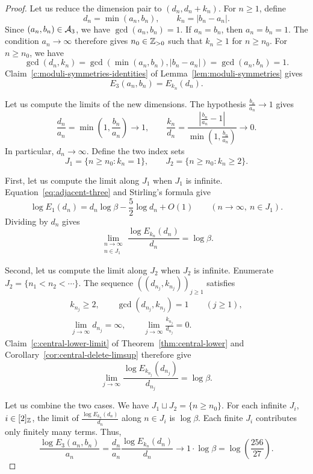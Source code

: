 \begin{proof}
Let us reduce the dimension pair to $(d_n,d_n+k_n)$.
For $n\ge1$, define
\[
 d_n=\min(a_n,b_n),\qquad k_n=|b_n-a_n|.
\]
Since $(a_n,b_n)\in\mathcal A_3$, we have $\gcd(a_n,b_n)=1$.
If $a_n=b_n$, then $a_n=b_n=1$.
The condition $a_n\to\infty$ therefore gives $n_0\in\mathbb Z_{>0}$ such that $k_n\ge1$ for $n\ge n_0$.
For $n\ge n_0$, we have
\[
 \gcd(d_n,k_n)=\gcd(\min(a_n,b_n),|b_n-a_n|)=\gcd(a_n,b_n)=1.
\]
Claim~\ref{c:moduli-symmetries-identities} of Lemma~\ref{lem:moduli-symmetries} gives
\[
 E_3(a_n,b_n)=E_{k_n}(d_n).
\]

Let us compute the limits of the new dimensions.
The hypothesis $\frac{b_n}{a_n}\to1$ gives
\[
 \frac{d_n}{a_n}=\min\left(1,\frac{b_n}{a_n}\right)\longrightarrow1,
 \qquad
 \frac{k_n}{d_n}
 =\frac{\left|\frac{b_n}{a_n}-1\right|}{\min\left(1,\frac{b_n}{a_n}\right)}
 \longrightarrow0.
\]
In particular, $d_n\to\infty$.
Define the two index sets
\[
 J_1=\{n\ge n_0:k_n=1\},\qquad
 J_2=\{n\ge n_0:k_n\ge2\}.
\]

First, let us compute the limit along $J_1$ when $J_1$ is infinite.
Equation~\eqref{eq:adjacent-three} and Stirling's formula give
\[
 \log E_1(d_n)=d_n\log\beta-\frac52\log d_n+O(1)
 \qquad(n\to\infty,\ n\in J_1).
\]
Dividing by $d_n$ gives
\[
 \lim_{\substack{n\to\infty\\n\in J_1}}
 \frac{\log E_{k_n}(d_n)}{d_n}=\log\beta.
\]

Second, let us compute the limit along $J_2$ when $J_2$ is infinite.
Enumerate $J_2=\{n_1<n_2<\cdots\}$.
The sequence $((d_{n_j},k_{n_j}))_{j\ge1}$ satisfies
\[
 \begin{gathered}
 k_{n_j}\ge2,\qquad \gcd(d_{n_j},k_{n_j})=1\qquad(j\ge1),\\
 \lim_{j\to\infty}d_{n_j}=\infty,\qquad
 \lim_{j\to\infty}\frac{k_{n_j}}{d_{n_j}}=0.
 \end{gathered}
\]
Claim~\ref{c:central-lower-limit} of Theorem~\ref{thm:central-lower} and
Corollary~\ref{cor:central-delete-limsup} therefore give
\[
 \lim_{j\to\infty}\frac{\log E_{k_{n_j}}(d_{n_j})}{d_{n_j}}=\log\beta.
\]

Let us combine the two cases.
We have $J_1\sqcup J_2=\{n\ge n_0\}$.
For each infinite $J_i$, $i\in[2]_{\mathbb Z}$, the limit of $\frac{\log E_{k_n}(d_n)}{d_n}$ along $n\in J_i$ is $\log\beta$. Each finite $J_i$ contributes only finitely many terms.
Thus,
\[
 \frac{\log E_3(a_n,b_n)}{a_n}
 =\frac{d_n}{a_n}\frac{\log E_{k_n}(d_n)}{d_n}
 \longrightarrow1\cdot\log\beta=\log\left(\frac{256}{27}\right).
\]
\end{proof}

